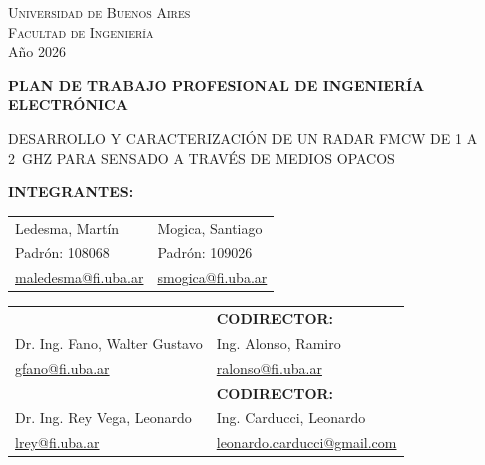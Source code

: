 \documentclass[11pt, a4paper, oneside]{article}
\newcommand{\Titulo}{Desarrollo y caracterización de un radar FMCW
de 1 a 2~GHz para sensado a través de medios opacos}
\begin{document}
\begin{titlepage}
  \thispagestyle{caratula}
  \centering
  \vspace*{-0.5cm}


  \vspace{0.9cm}
  {\large\textsc{Universidad de Buenos Aires}}\\[0.15cm]
  {\large\textsc{Facultad de Ingeniería}}\\[0.15cm]
  {\small Año 2026}

  \vspace{1.6cm}
  {\large\bfseries PLAN DE TRABAJO PROFESIONAL DE INGENIERÍA ELECTRÓNICA}

  \vspace{2.2cm}
  {\Large\linespread{1.35}\selectfont \MakeUppercase{\Titulo}\par}

  \vfill

  {\normalsize\bfseries INTEGRANTES:}\\[0.6cm]
  \begin{tabular}{@{} >{\centering\arraybackslash}p{6.5cm}
                      >{\centering\arraybackslash}p{6.5cm} @{}}
    Ledesma, Martín & Mogica, Santiago \\
    Padrón: 108068  & Padrón: 109026 \\
    \href{mailto:maledesma@fi.uba.ar}{maledesma@fi.uba.ar} &
    \href{mailto:smogica@fi.uba.ar}{smogica@fi.uba.ar} \\
  \end{tabular}

  \vspace{1.0cm}
  \begin{tabular}{@{} >{\centering\arraybackslash}p{6.5cm}
                      >{\centering\arraybackslash}p{6.5cm} @{}}
    {\normalsize\bfseries DIRECTOR:} & {\normalsize\bfseries CODIRECTOR:} \\[0.45cm]
    Dr. Ing. Fano, Walter Gustavo & Ing. Alonso, Ramiro \\
    \href{mailto:gfano@fi.uba.ar}{gfano@fi.uba.ar} &
    \href{mailto:ralonso@fi.uba.ar}{ralonso@fi.uba.ar} \\[0.6cm]
    {\normalsize\bfseries CODIRECTOR:} & {\normalsize\bfseries CODIRECTOR:} \\[0.45cm]
    Dr. Ing. Rey Vega, Leonardo & Ing. Carducci, Leonardo \\
    \href{mailto:lrey@fi.uba.ar}{lrey@fi.uba.ar} &
    \href{mailto:leonardo.carducci@gmail.com}{leonardo.carducci@gmail.com} \\
  \end{tabular}

  \vspace{0.6cm}
\end{titlepage}
\end{document}
